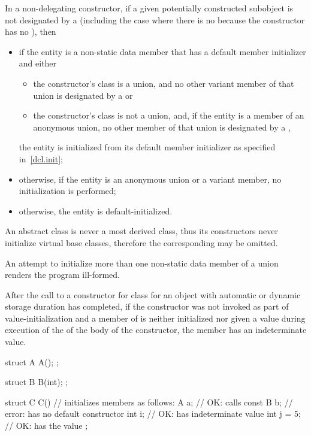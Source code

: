 \pnum
In a non-delegating constructor, if
a given potentially constructed subobject is not designated by a
(including the case where there is no
because the constructor has no
),
then
\begin{itemize}
\item if the entity is a non-static data member that has
a default member initializer and either
\begin{itemize}
\item the constructor's class is a union, and no other variant
member of that union is designated by a  or

\item the constructor's class is not a union, and, if the entity is a member of an
anonymous union, no other member of that union is designated by a
,
\end{itemize}
the entity is initialized from its default member initializer
as specified in~\ref{dcl.init};

\item otherwise, if the entity is an anonymous union or a variant member, no initialization is performed;

\item otherwise, the entity is default-initialized.
\end{itemize}

\begin{note}
An abstract class is never a most derived
class, thus its constructors never initialize virtual base classes, therefore the
corresponding  may be omitted.
\end{note}
An attempt to initialize more than one non-static data member of a union renders the
program ill-formed.
%
%
\begin{note}
After the call to a constructor for class
for an object with automatic or dynamic storage duration
has completed, if
the constructor was not invoked as part of value-initialization and
a member of
is neither initialized nor
given a value
during execution of the  of the body of the constructor,
the member has an indeterminate value.
\end{note}
\begin{example}
\begin{codeblock}
struct A {
  A();
};

struct B {
  B(int);
};

struct C {
  C() { }               // initializes members as follows:
  A a;                  // OK: calls 
  const B b;            // error:  has no default constructor
  int i;                // OK:  has indeterminate value
  int j = 5;            // OK:  has the value 
};
\end{codeblock}
\end{example}

